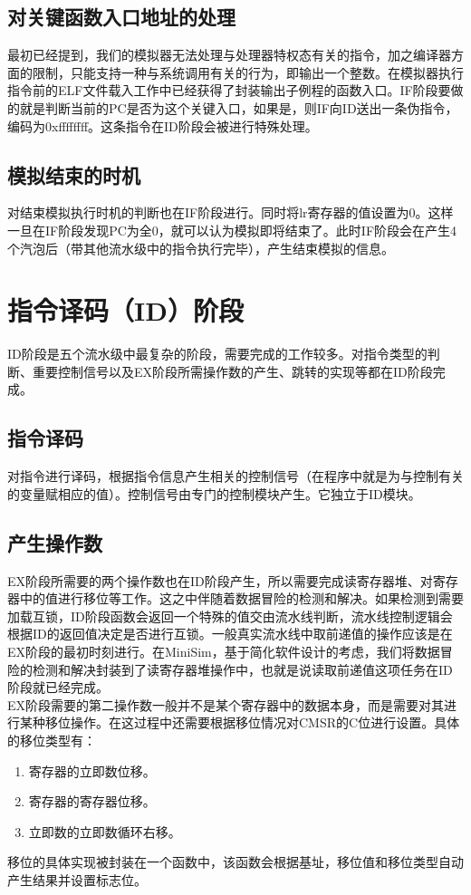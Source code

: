 \documentclass[12pt,a4paper,Flow]{report}
\begin{document}
\subsection{对关键函数入口地址的处理}
最初已经提到，我们的模拟器无法处理与处理器特权态有关的指令，加之编译器方面的限制，只能支持一种与系统调用有关的行为，即输出一个整数。在模拟器执行指令前的ELF文件载入工作中已经获得了封装输出子例程的函数入口。IF阶段要做的就是判断当前的PC是否为这个关键入口，如果是，则IF向ID送出一条伪指令，编码为0xffffffff。这条指令在ID阶段会被进行特殊处理。
\subsection{模拟结束的时机}
对结束模拟执行时机的判断也在IF阶段进行。同时将lr寄存器的值设置为0。这样一旦在IF阶段发现PC为全0，就可以认为模拟即将结束了。此时IF阶段会在产生4个汽泡后（带其他流水级中的指令执行完毕），产生结束模拟的信息。
\section{指令译码（ID）阶段}
ID阶段是五个流水级中最复杂的阶段，需要完成的工作较多。对指令类型的判断、重要控制信号以及EX阶段所需操作数的产生、跳转的实现等都在ID阶段完成。
\subsection{指令译码}
对指令进行译码，根据指令信息产生相关的控制信号（在程序中就是为与控制有关的变量赋相应的值）。控制信号由专门的控制模块产生。它独立于ID模块。
\subsection{产生操作数}
EX阶段所需要的两个操作数也在ID阶段产生，所以需要完成读寄存器堆、对寄存器中的值进行移位等工作。这之中伴随着数据冒险的检测和解决。如果检测到需要加载互锁，ID阶段函数会返回一个特殊的值交由流水线判断，流水线控制逻辑会根据ID的返回值决定是否进行互锁。一般真实流水线中取前递值的操作应该是在EX阶段的最初时刻进行。在MiniSim，基于简化软件设计的考虑，我们将数据冒险的检测和解决封装到了读寄存器堆操作中，也就是说读取前递值这项任务在ID阶段就已经完成。\\
\indent EX阶段需要的第二操作数一般并不是某个寄存器中的数据本身，而是需要对其进行某种移位操作。在这过程中还需要根据移位情况对CMSR的C位进行设置。具体的移位类型有：
\begin{enumerate}
\item 寄存器的立即数位移。
\item 寄存器的寄存器位移。
\item 立即数的立即数循环右移。
\end{enumerate}
移位的具体实现被封装在一个函数中，该函数会根据基址，移位值和移位类型自动产生结果并设置标志位。
\end{document}
